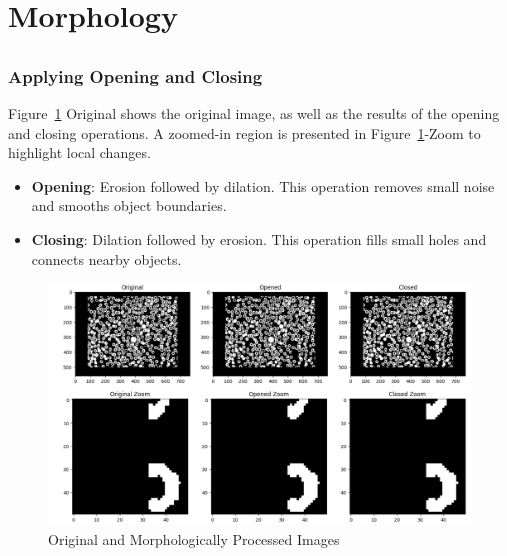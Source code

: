 \documentclass[12pt]{article}
\begin{document}
\subsection{}


\section{Morphology}
\subsection{} %

\subsubsection{Applying Opening and Closing} %

Figure~\ref{fig:full_images} Original shows the original image, as well as the results of the opening and closing operations. A zoomed-in region is presented in Figure~\ref{fig:full_images}-Zoom to highlight local changes.

\begin{itemize}
    \item \textbf{Opening}: Erosion followed by dilation. This operation removes small noise and smooths object boundaries.
    \item \textbf{Closing}: Dilation followed by erosion. This operation fills small holes and connects nearby objects.
\end{itemize}

\begin{figure}[ht]
    \centering
        \includegraphics[width=\textwidth]{pics/a7-4.1.1}
    \caption{Original and Morphologically Processed Images}
    \label{fig:full_images}
\end{figure}
\end{document}
